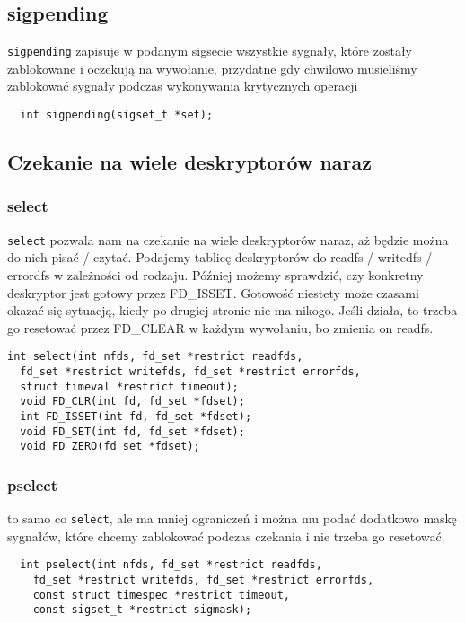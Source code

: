 \subsection{sigpending}
\texttt{sigpending} zapisuje w podanym sigsecie wszystkie sygnały, które zostały zablokowane i oczekują na wywołanie, przydatne gdy chwilowo musieliśmy zablokować sygnały podczas wykonywania krytycznych operacji
\begin{verbatim}
  int sigpending(sigset_t *set);
\end{verbatim}
\subsection{Czekanie na wiele deskryptorów naraz}
\subsubsection{select}
\texttt{select} pozwala nam na czekanie na wiele deskryptorów naraz, aż będzie można do nich pisać / czytać. Podajemy tablicę deskryptorów do readfs / writedfs / errordfs w zależności od rodzaju. Później możemy sprawdzić, czy konkretny deskryptor jest gotowy przez FD\_ISSET. Gotowość niestety może czasami okazać się sytuacją, kiedy po drugiej stronie nie ma nikogo. Jeśli działa, to trzeba go resetować przez FD\_CLEAR w każdym wywołaniu, bo zmienia on readfs.
\begin{verbatim}
int select(int nfds, fd_set *restrict readfds,
  fd_set *restrict writefds, fd_set *restrict errorfds,
  struct timeval *restrict timeout);
  void FD_CLR(int fd, fd_set *fdset);
  int FD_ISSET(int fd, fd_set *fdset);
  void FD_SET(int fd, fd_set *fdset);
  void FD_ZERO(fd_set *fdset);
\end{verbatim}
\subsubsection{pselect}
to samo co \texttt{select}, ale ma mniej ograniczeń i można mu podać dodatkowo maskę sygnałów, które chcemy zablokować podczas czekania i nie trzeba go resetować.
\begin{verbatim}
  int pselect(int nfds, fd_set *restrict readfds,
    fd_set *restrict writefds, fd_set *restrict errorfds,
    const struct timespec *restrict timeout,
    const sigset_t *restrict sigmask);
\end{verbatim}
